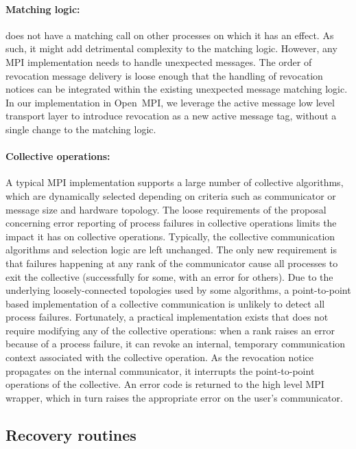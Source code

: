 \paragraph*{Matching logic:}  does not have a
matching call on other processes on which it has an effect. As such, it might
add detrimental complexity to the matching logic. However, any MPI
implementation needs to handle unexpected messages. The order of revocation
message delivery is loose enough that the handling of revocation notices can be
integrated within the existing unexpected message matching logic. In our
implementation in Open~MPI, we leverage the active message low level transport
layer to introduce revocation as a new active message tag, without a single
change to the matching logic.

\paragraph*{Collective operations:} A typical MPI implementation supports a
large number of collective algorithms, which are dynamically selected depending
on criteria such as communicator or message size and hardware topology. The
loose requirements of the proposal concerning error reporting of process
failures in collective operations limits the impact it has on collective
operations. Typically, the collective communication algorithms and selection
logic are left unchanged. The only new requirement is that failures happening at
any rank of the communicator cause all processes to exit the collective
(successfully for some, with an error for others). Due to the underlying
loosely-connected topologies used by some algorithms, a point-to-point based
implementation of a collective communication is unlikely to detect all process
failures.  Fortunately, a practical implementation exists that does not require
modifying any of the collective operations: when a rank raises an error because
of a process failure, it can revoke an internal, temporary communication
context associated with the collective operation. As the revocation notice
propagates on the internal communicator, it interrupts the point-to-point
operations of the collective. An error code is returned to the high level MPI
wrapper, which in turn raises the appropriate error on the user's communicator.

\subsection{Recovery routines}

